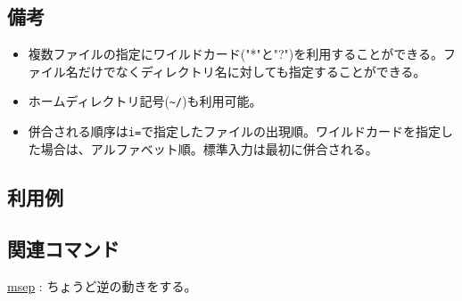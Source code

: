 \subsection*{備考}
\begin{itemize}
\item 複数ファイルの指定にワイルドカード("*"と"?")を利用することができる。ファイル名だけでなくディレクトリ名に対しても指定することができる。
\item ホームディレクトリ記号(\verb|~/|)も利用可能。
\item 併合される順序は\verb|i=|で指定したファイルの出現順。ワイルドカードを指定した場合は、アルファベット順。標準入力は最初に併合される。
\end{itemize}

\subsection*{利用例}


\subsection*{関連コマンド}
\hyperref[sect:msep]{msep} : ちょうど逆の動きをする。

%

